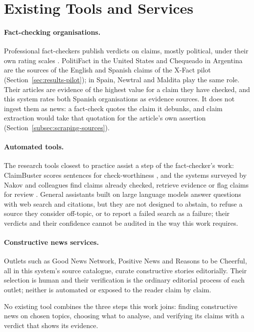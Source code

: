 
\section{Existing Tools and Services}
\label{sec:sota-tools}

\paragraph{Fact-checking organisations.} Professional fact-checkers
publish verdicts on claims, mostly political, under their own rating
scales \cite{graves2016rise}. PolitiFact in the United States and
Chequeado in Argentina are the sources of the English and Spanish
claims of the X-Fact pilot (Section~\ref{sec:results-pilot}); in Spain,
Newtral and Maldita play the same role. Their articles are evidence of
the highest value for a claim they have checked, and this system rates
both Spanish organisations as evidence sources. It does not ingest
them as news: a fact-check quotes the claim it debunks, and claim
extraction would take that quotation for the article's own assertion
(Section~\ref{subsec:scraping-sources}).

\paragraph{Automated tools.} The research tools closest to practice
assist a step of the fact-checker's work: ClaimBuster scores sentences
for check-worthiness \cite{hassan2017claimbuster}, and the systems
surveyed by Nakov and colleagues find claims already checked, retrieve
evidence or flag claims for review \cite{nakov2021assisting}. General
assistants built on large language models answer questions with web
search and citations, but they are not designed to abstain, to refuse
a source they consider off-topic, or to report a failed search as a
failure; their verdicts and their confidence cannot be audited in the
way this work requires.

\paragraph{Constructive news services.} Outlets such as Good News
Network, Positive News and Reasons to be Cheerful, all in this system's
source catalogue, curate constructive stories editorially. Their
selection is human and their verification is the ordinary editorial
process of each outlet; neither is automated or exposed to the reader
claim by claim.

No existing tool combines the three steps this work joins: finding
constructive news on chosen topics, choosing what to analyse, and
verifying its claims with a verdict that shows its evidence.
